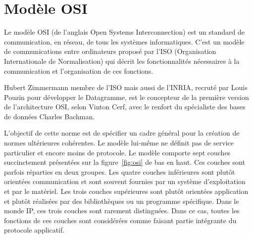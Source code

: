 \documentclass[12pt]{report}
\begin{document}

\section{Modèle OSI}

Le modèle OSI (de l'anglais Open Systems Interconnection) est un standard de communication, en réseau, de tous les systèmes informatiques. C'est un modèle de communications entre ordinateurs proposé par l'ISO (Organisation Internationale de Normalisation) qui décrit les fonctionnalités nécessaires à la communication et l'organisation de ces fonctions.

Hubert Zimmermann membre de l'ISO mais aussi de l'INRIA, recruté par Louis Pouzin pour développer le Datagramme, est le concepteur de la première version de l’architecture OSI, selon Vinton Cerf, avec le renfort du spécialiste des bases de données Charles Bachman.

L'objectif de cette norme est de spécifier un cadre général pour la création de normes ultérieures cohérentes. Le modèle lui-même ne définit pas de service particulier et encore moins de protocole.
Le modèle comporte sept couches succinctement présentées sur la figure~\ref{fig:osi} de bas en haut. Ces couches sont parfois réparties en deux groupes.
Les quatre couches inférieures sont plutôt orientées communication et sont souvent fournies par un système d'exploitation et par le matériel.
Les trois couches supérieures sont plutôt orientées application et plutôt réalisées par des bibliothèques ou un programme spécifique. Dans le monde IP, ces trois couches sont rarement distinguées. Dans ce cas, toutes les fonctions de ces couches sont considérées comme faisant partie intégrante du protocole applicatif\cite{wikiosi}.
\end{document}
